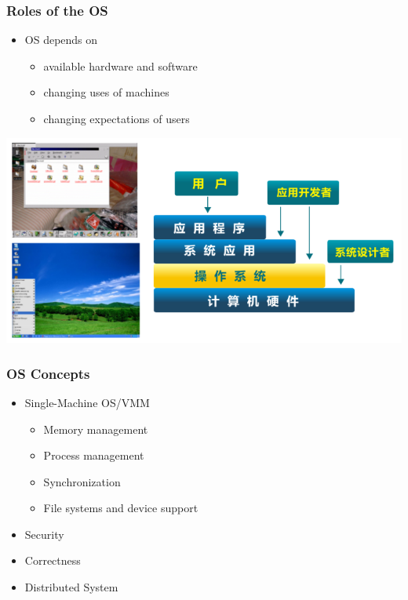 \begin{frame}[plain]	
	\frametitle{Roles of the OS}
	
	\begin{itemize}\Large
		\item OS depends on
		\begin{itemize}\Large
			\item available hardware and software
			\item changing uses of machines
			\item changing expectations of users
			
		\end{itemize}
	
	\end{itemize}
	\centering
	\includegraphics[width=0.5\linewidth]{os-position}
	
\end{frame}

\begin{frame}[plain]	
	\frametitle{OS Concepts}
	
	\begin{itemize}\Large
		\item Single-Machine OS/VMM
		\begin{itemize}\large
			\item Memory management
			\item Process management
			\item Synchronization
			\item File systems and device support
			
		\end{itemize}\pause
		\item Security
		\item Correctness
		\item Distributed System
	\end{itemize}
	
	
\end{frame}


